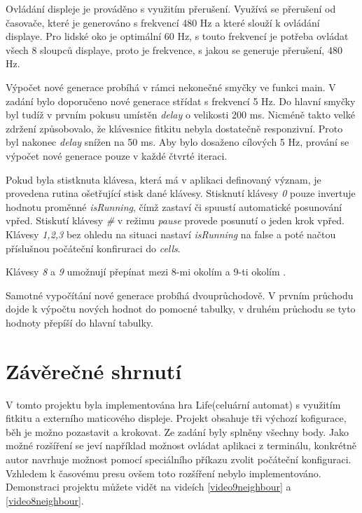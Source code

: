 \documentclass[12pt,a4paper,titlepage]{article}
\begin{document}
Ovládání displeje je prováděno s využitím přerušení. Využívá se přerušení od časovače, které je generováno s frekvencí 480 Hz a které slouží k ovládání displaye. Pro lidské oko je optimální 60 Hz, s touto frekvencí je potřeba ovládat všech 8 sloupců displaye, proto je frekvence, s jakou se generuje přerušení, 480 Hz.  

Výpočet nové generace probíhá v rámci nekonečné smyčky ve funkci main. V zadání bylo doporučeno nové generace střídat s frekvencí 5 Hz. Do hlavní smyčky byl tudíž v prvním pokusu umístěn \textit{delay}  o velikosti 200 ms. Nicméně takto velké zdržení způsobovalo, že klávesnice fitkitu nebyla dostatečně responzivní. Proto byl nakonec \textit{delay} snížen na 50 ms. Aby bylo dosaženo cílových 5 Hz, prování se výpočet nové generace pouze v každé čtvrté iteraci.

Pokud byla stistknuta klávesa, která má v aplikaci definovaný význam, je provedena rutina ošetřující stisk dané klávesy.
Stisknutí klávesy \textit{0} pouze invertuje hodnotu proměnné \textit{isRunning}, čímž zastaví či spuustí automatické posunování vpřed. Stiskutí klávesy \textit{\#} v režimu \textit{pause} provede posunutí o jeden krok vpřed. Klávesy \textit{1,2,3} bez ohledu na situaci nastaví \textit{isRunning} na false a poté načtou příslušnou počáteční konfiruraci do \textit{cells}.

Klávesy \textit{8} a \textit{9} umožnují přepínat mezi 8-mi okolím a 9-ti okolím .

Samotné vypočítání nové generace probíhá dvouprůchodově. V prvním průchodu dojde k výpočtu nových hodnot do pomocné tabulky, v druhém průchodu se tyto hodnoty přepíší do hlavní tabulky.

\section{Závěrečné shrnutí}
V tomto projektu byla implementována hra Life(celuární automat) s využitím fitkitu a externího maticového displeje. Projekt obsahuje tři výchozí kofigurace, běh je možno pozastavit a krokovat. Ze zadání byly splněny všechny body. Jako možné rozšíření se jeví například možnost ovládat aplikaci z terminálu, konkrétně autor navrhuje možnost pomocí speciálního příkazu zvolit počáteční konfiguraci. Vzhledem k časovému presu ovšem toto rozšíření nebylo implementováno. Demonstraci projektu můžete vidět na videích \ref{video9neighbour} a \ref{video8neighbour}.
\end{document}
